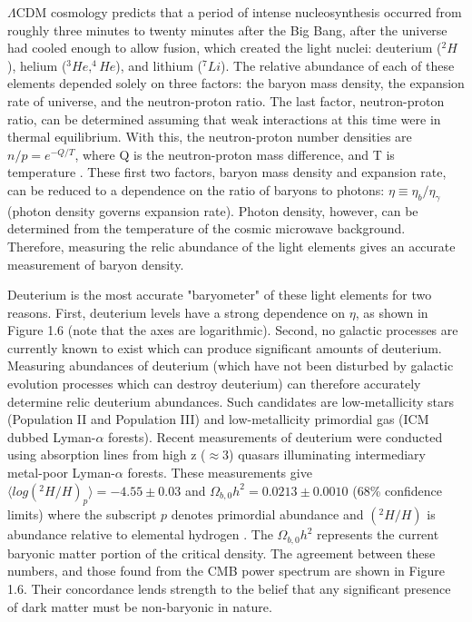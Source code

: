 \documentclass{report}
\begin{document}
$\Lambda$CDM cosmology predicts that a period of intense nucleosynthesis occurred from roughly three minutes to twenty minutes after the Big Bang, after the universe had cooled enough to allow fusion, which created the light nuclei: deuterium ($^2H$), helium ($^3He,^4He$), and lithium ($^7Li$). The relative abundance of each of these elements depended solely on three factors: the baryon mass density, the expansion rate of universe, and the neutron-proton ratio. The last factor, neutron-proton ratio, can be determined assuming that weak interactions at this time were in thermal equilibrium. With this, the neutron-proton number densities are $n/p = e^{-Q/T}$, where Q is the neutron-proton mass difference, and T is temperature \cite{Amsler2008}. These first two factors, baryon mass density and expansion rate, can be reduced to a dependence on the ratio of baryons to photons: $\eta \equiv \eta_{b}/\eta_{\gamma}$ (photon density governs expansion rate). Photon density, however, can be determined from the temperature of the cosmic microwave background. Therefore, measuring the relic abundance of the light elements gives an accurate measurement of baryon density.

Deuterium is the most accurate "baryometer" of these light elements for two reasons. First, deuterium levels have a strong dependence on $\eta$, as shown in Figure 1.6 (note that the axes are logarithmic). Second, no galactic processes are currently known to exist which can produce significant amounts of deuterium. Measuring abundances of deuterium (which have not been disturbed by galactic evolution processes which can destroy deuterium) can therefore accurately determine relic deuterium abundances. Such candidates are low-metallicity stars (Population II and Population III) and low-metallicity primordial gas (ICM dubbed Lyman-$\alpha$ forests). Recent measurements of deuterium were conducted using absorption lines from high z ($\approx 3$) quasars illuminating intermediary metal-poor Lyman-$\alpha$ forests. These measurements give $\langle log(^2H/H)_{p} \rangle = -4.55 \pm 0.03$ and $\Omega_{b,0}h^2 = 0.0213 \pm 0.0010$ (68\% confidence limits) where the subscript $p$ denotes primordial abundance and $(^2H/H)$ is abundance relative to elemental hydrogen \cite{Pettini2008}. The $\Omega_{b,0}h^2$ represents the current baryonic matter portion of the critical density. The agreement between these numbers, and those found from the CMB power spectrum are shown in Figure 1.6. Their concordance lends strength to the belief that any significant presence of dark matter must be non-baryonic in nature.
\end{document}

